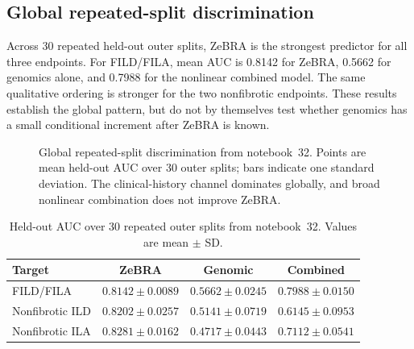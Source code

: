 \documentclass[journal]{IEEEtran}
\begin{document}
\subsection{Global repeated-split discrimination}
Across 30 repeated held-out outer splits, ZeBRA is the strongest predictor for all three endpoints. For FILD/FILA, mean AUC is 0.8142 for ZeBRA, 0.5662 for genomics alone, and 0.7988 for the nonlinear combined model. The same qualitative ordering is stronger for the two nonfibrotic endpoints. These results establish the global pattern, but do not by themselves test whether genomics has a small conditional increment after ZeBRA is known.

\begin{figure}[!t]
\centering
{}
\caption{Global repeated-split discrimination from notebook~32. Points are mean held-out AUC over 30 outer splits; bars indicate one standard deviation. The clinical-history channel dominates globally, and broad nonlinear combination does not improve ZeBRA.}
\label{fig:global-auc}
\end{figure}

\begin{table}[!t]
\caption{Held-out AUC over 30 repeated outer splits from notebook~32. Values are mean $\pm$ SD.}
\label{tab:auc-repeated}\centering\footnotesize
\begin{tabular}{lccc}\toprule
Target & ZeBRA & Genomic & Combined\\\midrule
FILD/FILA & $0.8142\pm0.0089$ & $0.5662\pm0.0245$ & $0.7988\pm0.0150$\\
Nonfibrotic ILD & $0.8202\pm0.0257$ & $0.5141\pm0.0719$ & $0.6145\pm0.0953$\\
Nonfibrotic ILA & $0.8281\pm0.0162$ & $0.4717\pm0.0443$ & $0.7112\pm0.0541$\\\bottomrule
\end{tabular}
\end{table}
\end{document}

